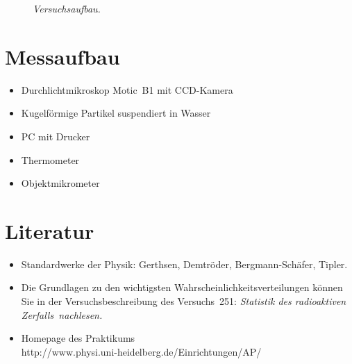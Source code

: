 \documentclass{../papanleitung}
\begin{document}
\begin{figure}[h]
\begin{minipage}[c]{12cm}
\centering{}
\caption{\fontsize{10}{12}\it Versuchsaufbau.}
\end{minipage}
\end{figure}


\section{Messaufbau}
\begin{itemize}
 \item Durchlichtmikroskop Motic~B1 mit CCD-Kamera
 \item Kugelf\"{o}rmige Partikel suspendiert in Wasser
 \item PC mit Drucker
 \item Thermometer
 \item Objektmikrometer
\end{itemize}


\section{Literatur}

\begin{itemize}
\item Standardwerke der Physik: Gerthsen, Demtr\"{o}der,
Bergmann-Sch\"{a}fer, Tipler.
 \item Die Grundlagen  zu den wichtigsten Wahrscheinlichkeitsverteilungen k\"{o}nnen Sie in der Versuchsbeschreibung des Versuchs~251: \it
 Statistik des radioaktiven Zerfalls\rm~nachlesen.
 \item  Homepage des Praktikums\\
http://www.physi.uni-heidelberg.de/Einrichtungen/AP/
\end{itemize}
\end{document}
